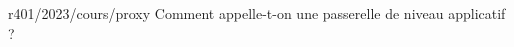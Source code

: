 \begin{question}{r401/2023/cours/proxy}
  Comment appelle-t-on une passerelle de niveau applicatif ?
  \begin{reponseshoriz}
  \end{reponseshoriz}
\end{question}
